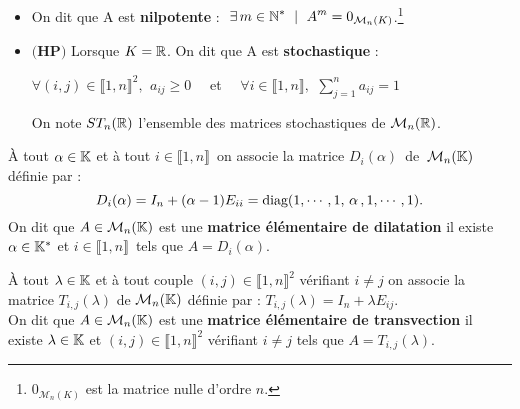 \begin{itemize}[leftmargin=0cm,rightmargin=0cm, label=•]
    \item On dit que A est \textbf{nilpotente} \ssi : \(\displaystyle \ \exists\, m\in \NN^* \ \mid \ A^m=0_{\mathcal{M}_n(K)}\).\footnote{$0_{\mathcal{M}_n(K)}$ est la matrice nulle d'ordre $n$.}\vspace{0.2cm}

    \item \(\bigl(\mathbf{H} \mathbf{P}\bigr)\) Lorsque \(K=\mathbb{R}\). On dit que A est \textbf{stochastique} \ssi :\vspace{-0.2cm}
    
    \hspace{3cm}\(\forall (i,j)\in \llbracket 1,n \rrbracket^2,\ \, a_{ij}\geq 0\quad \) et \(\displaystyle \quad \forall i\in \llbracket 1,n \rrbracket,\ \, \sum_{j=1}^{n}a_{ij}=1\)\vspace{0.15cm}\\
    \begin{small}
        On note \(ST_n(\mathbb{R})\) l'ensemble des matrices stochastiques de \(\mathcal{M}_n(\mathbb{R})\).
    \end{small}
\end{itemize}

\vspace{1.7cm}

\noindent À tout \(\alpha \in \mathbb{K}\)\expo{*} et à tout \(i\in \llbracket 1,n \rrbracket \,\) on associe la matrice \(D_i(\alpha)\,\) de \(\,\mathcal{M}_n(\mathbb{K})\) définie par :\vspace{-0.35cm}\\
\[D_i(\alpha)=I_n+(\alpha-1)E_{ii}=\text{diag}(1,\cdots,1,\,\alpha\,,1,\cdots,1).\vspace{0.2cm}\]
On dit que \(A\in \mathcal{M}_n(\mathbb{K})\) est une \textbf{matrice élémentaire de dilatation} \ssi il existe \(\alpha\in \mathbb{K}^*\) et \(i\in \llbracket 1,n \rrbracket \,\) tels que \(A=D_i(\alpha)\).

\vspace{1.2cm}

À tout \(\lambda\in\mathbb{K}\) et à tout couple \((i,j)\in \llbracket 1,n \rrbracket ^2\) vérifiant \(i\neq j\) on associe la matrice \(T_{i,j}(\lambda)\) de \(\mathcal{M}_n(\mathbb{K})\) définie par : \(T_{i,j}(\lambda)=I_n+\lambda E_{ij}\).\vspace{0.2cm}\\
On dit que \(A\in \mathcal{M}_n(\mathbb{K})\) est une \textbf{matrice élémentaire de transvection} \ssi il existe \(\lambda\in \mathbb{K}\) et \((i,j)\in \llbracket 1,n \rrbracket ^2\) vérifiant \(i\neq j\) tels que \(A=T_{i,j}(\lambda)\).

